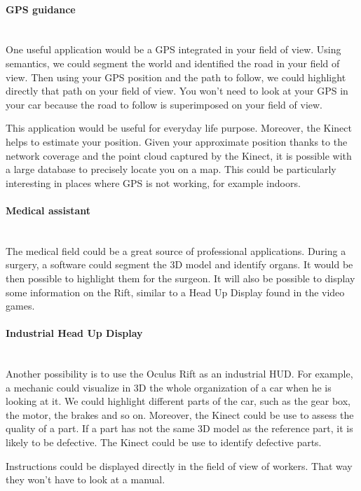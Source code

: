 \documentclass[12pt, twoside]{article}
\begin{document}
\paragraph{GPS guidance}~\\
One useful application would be a GPS integrated in your field of view. Using semantics, we could segment the world and identified the road in your field of view. Then using your GPS position and the path to follow, we could highlight directly that path on your field of view. You won't need to look at your GPS in your car because the road to follow is superimposed on your field of view.

This application would be useful for everyday life purpose. Moreover, the Kinect helps to estimate your position. Given your approximate position thanks to the network coverage and the point cloud captured by the Kinect, it is possible with a large database to precisely locate you on a map. This could be particularly interesting in places where GPS is not working, for example indoors.

\paragraph{Medical assistant}~\\
The medical field could be a great source of professional applications. During a surgery, a software could segment the 3D model and identify organs. It would be then possible to highlight them for the surgeon. It will also be possible to display some information on the Rift, similar to a Head Up Display found in the video games.

\paragraph{Industrial Head Up Display}~\\
Another possibility is to use the Oculus Rift as an industrial HUD. For example, a mechanic could visualize in 3D the whole organization of a car when he is looking at it. We could highlight different parts of the car, such as the gear box, the motor, the brakes and so on. Moreover, the Kinect could be use to assess the quality of a part. If a part has not the same 3D model as the reference part, it is likely to be defective. The Kinect could be use to identify defective parts.

Instructions could be displayed directly in the field of view of workers. That way they won't have to look at a manual.
\end{document}
